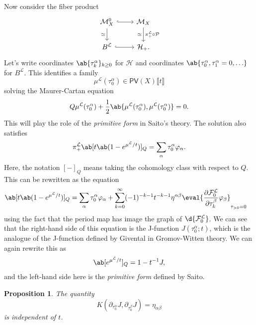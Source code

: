 \documentclass{amsart}
\newtheorem{prop}[thm]{Proposition}
\theoremstyle{definition}
\theoremstyle{remark}
\theoremstyle{plain}
\theoremstyle{definition}
\theoremstyle{remark}
\newcommand{\mc}[1]{\mathcal{#1}}
\newcommand{\ms}[1]{\mathsf{#1}}
\newcommand{\1}{\mathbf{1}}
\newcommand{\2}{\mathbf{2}}
\newcommand{\3}{\mathbf{3}}
\newcommand{\ps}[1]{\lBrack #1 \rBrack}
\begin{document}
Now consider the fiber product
\begin{equation*}
\begin{tikzcd}
    \mc{M}_X^0 \ar[hookrightarrow]{r} \ar{d}[swap]{\simeq} & \mc{M}_X \ar{d}{\pi_+^{\mc{L}} \circ \mc{P}}[swap]{\simeq} \\
    B^{\mc{L}} \ar[hookrightarrow]{r} & \mc{H}_+.
\end{tikzcd}
\end{equation*}
Let's write coordinates \(\ab\{ \tau_k^{\alpha}\}_{k \geq 0}\) for \(\mc{H}\) and coordinates \(\ab\{\tau_0^{\alpha}, \tau_1^{\alpha} = 0, \ldots \}\) for \(B^{\mc{L}}\). This identifies a family 
\[ \mu^{\mc{L}}(\tau_0^{\alpha}) \in \ms{PV}(X) \ps{t} \]
solving the Maurer-Cartan equation
\[ Q \mu^{\mc{L}}(\tau_0^{\alpha}) + \frac{1}{2} \ab\{\mu^{\mc{L}}(\tau_0^{\alpha}), \mu^{\mc{L}}(\tau_0^{\alpha})\} = 0. \]
This will play the role of the \textit{primitive form} in Saito's theory. The solution also satisfies
\[ \pi_+^{\mc{L}} \ab[t \ab(1-e^{\mu^{\mc{L}}/t})]_Q = \sum_{\alpha} \tau_0^{\alpha} \varphi_{\alpha}. \]
Here, the notation \([-]_Q\) means taking the cohomology class with respect to \(Q\). This can be rewritten as the equation
\begin{align*}
    \ab[t \ab(1-e^{\mu^{\mc{L}}/t})]_Q &= \sum_{\alpha} \tau_0^{\alpha} \varphi_{\alpha} + \sum_{k=0}^{\infty} (-1)^{-k-1} t^{-k-1} \eta^{\alpha\beta} \eval{\pdv{\mc{F}_0^{\mc{L}}}{\tau_k^{\beta}} \varphi_{\beta}}_{\tau_{>0} = 0}
\end{align*}
using the fact that the period map has image the graph of \(\d{\mc{F}_0^{\mc{L}}}\). We can see that the right-hand side of this equation is the J-function \(J(\tau_0^{\alpha}; t)\), which is the analogue of the J-function defined by Givental in Gromov-Witten theory. We can again rewrite this as
\[ \ab[e^{\mu^{\mc{L}}/t}]_Q = 1 - t^{-1} J, \]
and the left-hand side here is the \textit{primitive form} defined by Saito.

\begin{prop}
    The quantity
    \[ K(\partial_{\tau_0^{\alpha}} J, \partial_{\tau_0^{\beta}} J) = \eta_{\alpha \beta} \]
    is independent of \(t\).
\end{prop}
\end{document}
